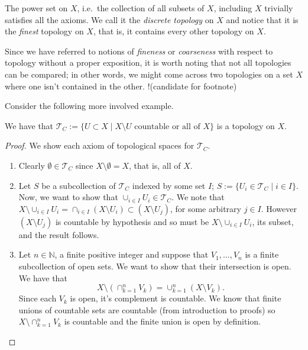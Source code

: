 \begin{exmp}
  \label{exmp:discrete}
  The power set on $X$, i.e.\ the collection of all subsets of $X$,
  including $X$ trivially satisfies all the axioms. We call it the
  \emph{discrete topology} on $X$ and notice that it is the
  \emph{finest} topology on $X$, that is, it contains every other
  topology on $X$.
\end{exmp}

Since we have referred to notions of \emph{fineness} or
\emph{coarseness} with respect to topology without a proper
exposition, it is worth noting that not all topologies can be
compared; in other words, we might come across two topologies on a set
$X$ where one isn't contained in the other. !(candidate for footnote)


Consider the following more involved example.

\begin{exmp}
  \label{exmp:countable}
  We have that $\mathscr{T}_C := \{U \subset X \mid X \setminus U
  \text{ countable or all of } X \}$ is a topology on $X$.
\end{exmp}

\begin{proof} %
  We show each axiom of topological spaces for $\mathscr{T}_C$.
  \begin{enumerate}
  \item Clearly $\emptyset \in \mathscr{T}_C$ since $X \setminus
    \emptyset = X$, that is, all of $X$.
  \item Let $S$ be a subcollection of $\mathscr{T}_C$ indexed by some
    set $I$; $S := \{U_i \in \mathscr{T}_C \mid i \in I \}$. Now, we
    want to show that $\cup_{i \in I} U_i \in \mathscr{T}_C$. We note
    that $X \setminus \cup_{i \in I} U_i = \cap_{i \in I}(X \setminus
    U_i) \subset (X \setminus U_j)$, for some arbitrary $j \in
    I$. However $(X \setminus U_j)$ is countable by hypothesis and so
    must be $X \setminus \cup_{i \in I} U_i$, its subset, and the
    result follows.
  \item Let $n \in \mathbb{N}$, a finite positive integer and suppose
    that $V_1, \dots, V_n$ is a finite subcollection of open sets. We
    want to show that their intersection is open. We have that
    \[
      X \setminus (\cap_{k=1}^n V_k) = \cup_{k=1}^n (X \setminus V_k).
    \]
    Since each $V_k$ is open, it's complement is countable. We know
    that finite unions of countable sets are countable (from
    introduction to proofs) so $X \setminus \cap_{k=1}^n V_k$ is   %
    countable and the finite union is open by definition.
  \end{enumerate}
\end{proof}

